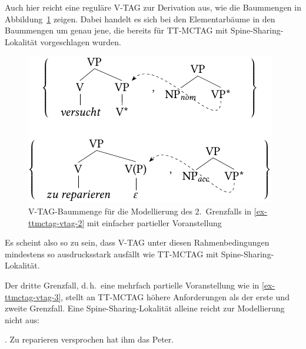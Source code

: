 Auch hier reicht eine reguläre V-TAG zur Derivation aus, wie die Baummengen in Abbildung~\ref{fig-ttmctag-vtag-2} zeigen. Dabei handelt es sich bei den Elementarbäume in den Baummengen um genau jene, die bereits für TT-MCTAG mit Spine-Sharing-Lokalität vorgeschlagen wurden.
\begin{figure}[t]
\centering
\includegraphics{graphics/abb742.pdf}
\caption{\label{fig-ttmctag-vtag-2}V-TAG-Baummenge für die Modellierung des 2.~Grenzfalls in \ref{ex-ttmctag-vtag-2} mit einfacher partieller Voranstellung}
\end{figure}
Es scheint also so zu sein, dass V-TAG unter diesen Rahmenbedingungen mindestens so ausdrucksstark ausfällt wie TT-MCTAG mit Spine-Sharing-Lokalität. 


Der dritte Grenzfall, d.\,h.\ eine mehrfach partielle Voranstellung wie in \ref{ex-ttmctag-vtag-3}, stellt an TT-MCTAG höhere Anforderungen als der erste und zweite Grenzfall. Eine Spine-Sharing-Loka\-li\-tät alleine reicht zur Modellierung nicht aus:

\ex. Zu reparieren versprochen hat ihm das Peter. \label{ex-ttmctag-vtag-3}

